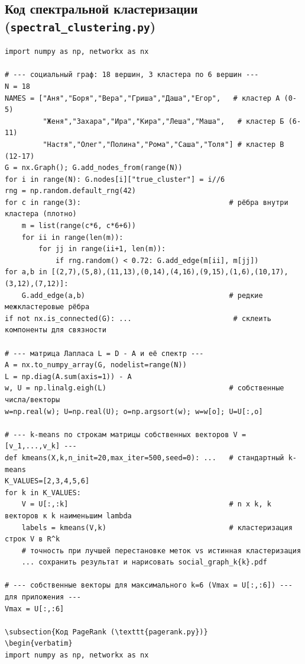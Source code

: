 \documentclass[12pt,a4paper]{article}
\begin{document}
\subsection{Код спектральной кластеризации (\texttt{spectral\_clustering.py})}
\begin{verbatim}
import numpy as np, networkx as nx

# --- социальный граф: 18 вершин, 3 кластера по 6 вершин ---
N = 18
NAMES = ["Аня","Боря","Вера","Гриша","Даша","Егор",   # кластер А (0-5)
         "Женя","Захара","Ира","Кира","Леша","Маша",   # кластер Б (6-11)
         "Настя","Олег","Полина","Рома","Саша","Толя"] # кластер В (12-17)
G = nx.Graph(); G.add_nodes_from(range(N))
for i in range(N): G.nodes[i]["true_cluster"] = i//6
rng = np.random.default_rng(42)
for c in range(3):                                   # рёбра внутри кластера (плотно)
    m = list(range(c*6, c*6+6))
    for ii in range(len(m)):
        for jj in range(ii+1, len(m)):
            if rng.random() < 0.72: G.add_edge(m[ii], m[jj])
for a,b in [(2,7),(5,8),(11,13),(0,14),(4,16),(9,15),(1,6),(10,17),(3,12),(7,12)]:
    G.add_edge(a,b)                                  # редкие межкластеровые рёбра
if not nx.is_connected(G): ...                        # склеить компоненты для связности

# --- матрица Лапласа L = D - A и её спектр ---
A = nx.to_numpy_array(G, nodelist=range(N))
L = np.diag(A.sum(axis=1)) - A
w, U = np.linalg.eigh(L)                             # собственные числа/векторы
w=np.real(w); U=np.real(U); o=np.argsort(w); w=w[o]; U=U[:,o]

# --- k-means по строкам матрицы собственных векторов V = [v_1,...,v_k] ---
def kmeans(X,k,n_init=20,max_iter=500,seed=0): ...   # стандартный k-means
K_VALUES=[2,3,4,5,6]
for k in K_VALUES:
    V = U[:,:k]                                      # n x k, k векторов к k наименьшим lambda
    labels = kmeans(V,k)                             # кластеризация строк V в R^k
    # точность при лучшей перестановке меток vs истинная кластеризация
    ... сохранить результат и нарисовать social_graph_k{k}.pdf

# --- собственные векторы для максимального k=6 (Vmax = U[:,:6]) --- для приложения ---
Vmax = U[:,:6]

\subsection{Код PageRank (\texttt{pagerank.py})}
\begin{verbatim}
import numpy as np, networkx as nx


\end{verbatim}
\end{document}
